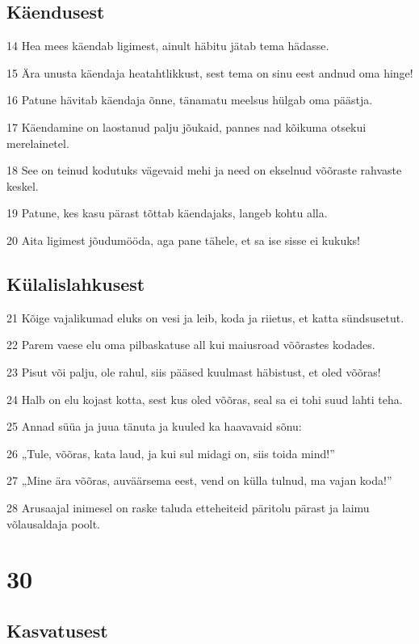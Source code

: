 \section*{Käendusest}

\par 14 Hea mees käendab ligimest, ainult häbitu jätab tema hädasse.
\par 15 Ära unusta käendaja heatahtlikkust, sest tema on sinu eest andnud oma hinge!
\par 16 Patune hävitab käendaja õnne, tänamatu meelsus hülgab oma päästja.
\par 17 Käendamine on laostanud palju jõukaid, pannes nad kõikuma otsekui merelainetel.
\par 18 See on teinud kodutuks vägevaid mehi ja need on ekselnud võõraste rahvaste keskel.
\par 19 Patune, kes kasu pärast tõttab käendajaks, langeb kohtu alla.
\par 20 Aita ligimest jõudumööda, aga pane tähele, et sa ise sisse ei kukuks!

\section*{Külalislahkusest}

\par 21 Kõige vajalikumad eluks on vesi ja leib, koda ja riietus, et katta sündsusetut.
\par 22 Parem vaese elu oma pilbaskatuse all kui maiusroad võõrastes kodades.
\par 23 Pisut või palju, ole rahul, siis pääsed kuulmast häbistust, et oled võõras!
\par 24 Halb on elu kojast kotta, sest kus oled võõras, seal sa ei tohi suud lahti teha.
\par 25 Annad süüa ja juua tänuta ja kuuled ka haavavaid sõnu:
\par 26 „Tule, võõras, kata laud, ja kui sul midagi on, siis toida mind!”
\par 27 „Mine ära võõras, auväärsema eest, vend on külla tulnud, ma vajan koda!”
\par 28 Arusaajal inimesel on raske taluda etteheiteid päritolu pärast ja laimu võlausaldaja poolt.

\chapter{30}

\section*{Kasvatusest}

